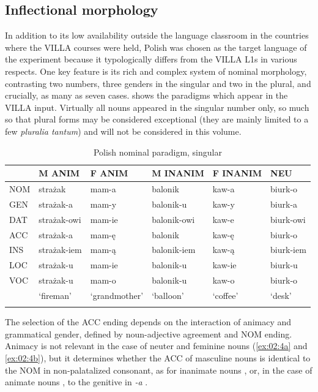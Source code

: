 \subsection{Inflectional morphology}\label{sec:02:2.1}

In addition to its low availability outside the language classroom in the countries where the VILLA courses were held, Polish was chosen as the target language of the experiment because it typologically differs from the VILLA L1s in various respects. One key feature is its rich and complex system of nominal morphology, contrasting two numbers, three genders in the singular and two in the plural, and crucially, as many as seven cases.  shows the paradigms which appear in the VILLA input. Virtually all nouns appeared in the singular number only, so much so that plural forms may be considered exceptional (they are mainly limited to a few \textit{pluralia tantum}) and will not be considered in this volume.

\begin{table}
    \begin{tabular}{llllll}
\lsptoprule
         & M ANIM & F ANIM & M INANIM & F INANIM & NEU\\
\midrule
        NOM & strażak & mam-a & balonik & kaw-a & biurk-o\\
        GEN & strażak-a & mam-y & balonik-u & kaw-y & biurk-a\\
        DAT & strażak-owi & mam-ie & balonik-owi & kaw-e & biurk-owi\\
        ACC & strażak-a & mam-ę & balonik & kaw-ę & biurk-o\\
        INS & strażak-iem & mam-ą & balonik-iem & kaw-ą & biurk-iem\\
        LOC & strażak-u & mam-ie & balonik-u & kaw-ie & biurk-u\\
        VOC & strażak-u & mam-o & balonik-u & kaw-o & biurk-o\\
        & ‘fireman’ & ‘grandmother’ & ‘balloon’ & ‘coffee’ & ‘desk’\\
\lspbottomrule
    \end{tabular}
    \caption{Polish nominal paradigm, singular}
    \label{tab:02:1}
\end{table}

The selection of the ACC ending depends on the interaction of animacy and grammatical gender, defined by noun-adjective agreement and NOM ending. Animacy is not relevant in the case of neuter and feminine nouns (\ref{ex:02:4a} and \ref{ex:02:4b}), but it determines whether the ACC of masculine nouns is identical to the NOM in non-palatalized consonant, as for inanimate nouns , or, in the case of animate nouns , to the genitive in \textit{-a} .

